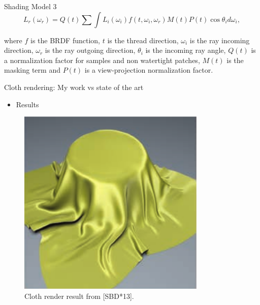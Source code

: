 \documentclass{beamer}
\begin{document}
\begin{frame}{Shading Model 3}
\begin{equation*}
L_r(\omega_r) = Q(t) \sum \int L_i(\omega_i) f(t, \omega_i, \omega_r) M(t) P(t) \cos \theta_i d \omega_i,
\end{equation*}

\footnotesize{where $f$ is the BRDF function, $t$ is the thread direction, $\omega_i$ is the ray incoming direction, $\omega_r$ is the ray outgoing direction, $\theta_i$ is the incoming ray angle, $Q(t)$ is a normalization factor for samples and non watertight patches, $M(t)$ is the masking term and $P(t)$ is a view-projection normalization factor.}
\end{frame}

\begin{frame}{Cloth rendering: My work vs state of the art}
\begin{itemize}
\setlength\itemsep{0.5em}
\item Results
\end{itemize}
\begin{figure}[!htb]
    \centering
    \begin{minipage}{.5\textwidth}
        \centering
        \includegraphics[width=0.8\textwidth]{img/cloth_paper}
        \caption*{Cloth render result from [SBD*13].}
    \end{minipage}%
	\centering
    \begin{minipage}{.5\textwidth}
        \centering

\end{minipage}
\end{figure}
\end{frame}
\end{document}
